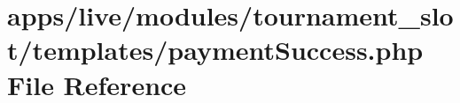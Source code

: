 \hypertarget{live_2modules_2tournament__slot_2templates_2payment_success_8php}{\section{apps/live/modules/tournament\-\_\-slot/templates/payment\-Success.php File Reference}
\label{live_2modules_2tournament__slot_2templates_2payment_success_8php}
}
